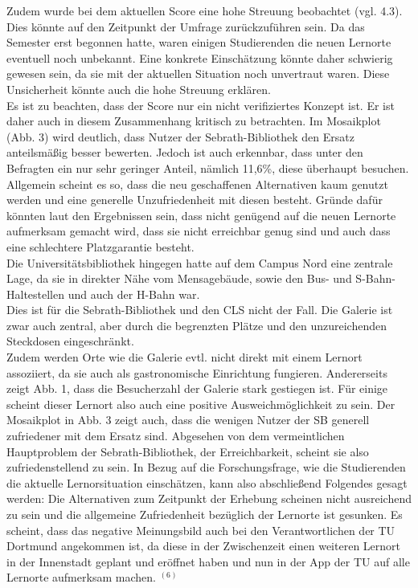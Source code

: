 \documentclass[11pt, a4paper]{article}
\begin{document}
Zudem wurde bei dem aktuellen Score eine hohe Streuung beobachtet (vgl. 4.3). Dies könnte auf den Zeitpunkt der Umfrage zurückzuführen sein. Da das Semester erst begonnen hatte, waren einigen Studierenden die neuen Lernorte eventuell noch unbekannt. Eine konkrete Einschätzung könnte daher schwierig gewesen sein, da sie mit der aktuellen Situation noch unvertraut waren. Diese Unsicherheit könnte auch die hohe Streuung erklären.\\
Es ist zu beachten, dass der Score nur ein nicht verifiziertes Konzept ist. Er ist daher auch in diesem Zusammenhang kritisch zu betrachten.
Im Mosaikplot (Abb. 3) wird deutlich, dass Nutzer der Sebrath-Bibliothek den Ersatz anteilsmäßig besser bewerten. Jedoch ist auch erkennbar, dass unter den Befragten ein nur sehr geringer Anteil, nämlich 11,6\%, diese überhaupt besuchen.\\
Allgemein scheint es so, dass die neu geschaffenen Alternativen kaum genutzt werden und eine generelle Unzufriedenheit mit diesen besteht. Gründe dafür könnten laut den Ergebnissen sein, dass nicht genügend auf die neuen Lernorte aufmerksam gemacht wird, dass sie nicht erreichbar genug sind und auch dass eine schlechtere Platzgarantie besteht.\\
Die Universitätsbibliothek hingegen hatte auf dem Campus Nord eine zentrale Lage, da sie in direkter Nähe vom Mensagebäude, sowie den Bus- und S-Bahn-Haltestellen und auch der H-Bahn war. \\
Dies ist für die Sebrath-Bibliothek und den CLS nicht der Fall. Die Galerie ist zwar auch zentral, aber durch die begrenzten Plätze und den unzureichenden Steckdosen eingeschränkt.\\
Zudem werden Orte wie die Galerie evtl. nicht direkt mit einem Lernort assoziiert, da sie auch als gastronomische Einrichtung fungieren.
Andererseits zeigt Abb. 1, dass die Besucherzahl der Galerie stark gestiegen ist.
Für einige scheint dieser Lernort also auch eine positive Ausweichmöglichkeit zu sein.
Der Mosaikplot in Abb. 3 zeigt auch, dass die wenigen Nutzer der SB generell zufriedener mit dem Ersatz sind. Abgesehen von dem vermeintlichen Hauptproblem der Sebrath-Bibliothek, der Erreichbarkeit, scheint sie also zufriedenstellend zu sein.
In Bezug auf die Forschungsfrage, wie die Studierenden die aktuelle Lernorsituation einschätzen, kann also abschließend Folgendes gesagt werden: Die Alternativen zum Zeitpunkt der Erhebung scheinen nicht ausreichend zu sein und die allgemeine Zufriedenheit bezüglich der Lernorte ist gesunken.
Es scheint, dass das negative Meinungsbild auch bei den Verantwortlichen der TU Dortmund angekommen ist, da diese in der Zwischenzeit einen weiteren Lernort in der Innenstadt geplant und eröffnet haben und nun in der App der TU auf alle Lernorte aufmerksam machen. \hyperref[seitenverweis]{$^{(6)}$}
\end{document}
